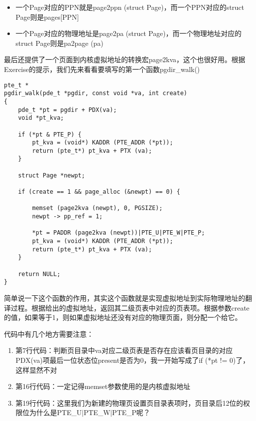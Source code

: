 \documentclass{article}
\newcommand{\funcname}[1]{{\ttfamily \small #1}}
\begin{document}
\begin{CJK*}{UTF8}{gkai}
\begin{itemize}
\item{一个Page对应的PPN就是page2ppn (struct \hspace{0.5ex}Page)，而一个PPN对应的struct \hspace{0.5ex}Page则是pages[PPN]}
\item{一个Page对应的物理地址是page2pa (struct \hspace{0.5ex}Page)，而一个物理地址对应的struct \hspace{0.5ex}Page则是pa2page (pa)}
\end{itemize}

最后还提供了一个页面到内核虚拟地址的转换宏page2kva，这个也很好用。根据Exercise的提示，我们先来看看要填写的第一个函数\funcname{pgdir\_walk()}



\begin{lstlisting}[style=ccode, title={\scriptsize \ttfamily \bfseries kern/pmap.c: pgdir\_walk ()}]
pte_t *
pgdir_walk(pde_t *pgdir, const void *va, int create)
{
    pde_t *pt = pgdir + PDX(va);
    void *pt_kva;

    if (*pt & PTE_P) {
        pt_kva = (void*) KADDR (PTE_ADDR (*pt));
        return (pte_t*) pt_kva + PTX (va);
    }

    struct Page *newpt;

    if (create == 1 && page_alloc (&newpt) == 0) {
    
        memset (page2kva (newpt), 0, PGSIZE);
        newpt -> pp_ref = 1;

        *pt = PADDR (page2kva (newpt))|PTE_U|PTE_W|PTE_P;
        pt_kva = (void*) KADDR (PTE_ADDR (*pt));
        return (pte_t*) pt_kva + PTX (va);
    }

    return NULL;
}
\end{lstlisting}

简单说一下这个函数的作用，其实这个函数就是实现虚拟地址到实际物理地址的翻译过程。根据给出的虚拟地址，返回其二级页表中对应的页表项。根据参数create的值，如果等于1，则如果虚拟地址还没有对应的物理页面，则分配一个给它。

代码中有几个地方需要注意：

\begin{enumerate}
\item{第7行代码：判断页目录中va对应二级页表是否存在应该看页目录的对应PDX(va)项最后一位状态位present是否为0，我一开始写成了if (*pt != 0)了，这样显然不对}
\item{第16行代码：一定记得memset参数使用的是内核虚拟地址}
\item{第19行代码：这里我们为新建的物理页设置页目录表项时，页目录后12位的权限位为什么是PTE\_U$\left|\right.$PTE\_W$\left|\right.$PTE\_P呢？}
\end{enumerate}


\end{CJK*}
\end{document}
